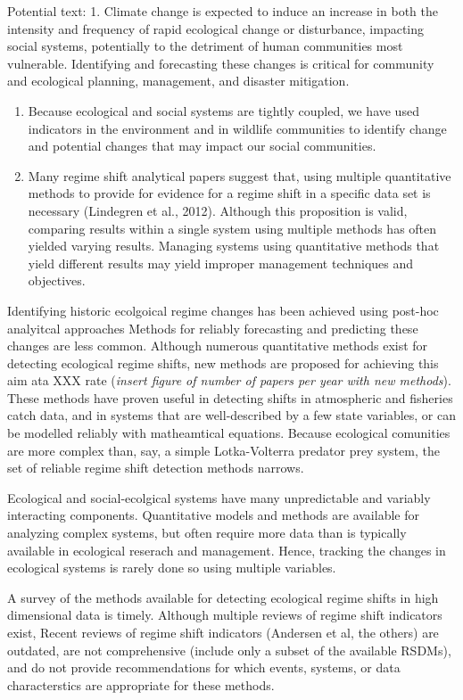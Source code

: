 \documentclass[12pt,twoside,openany]{reedthesis}
\begin{document}
Potential text: 1. Climate change is expected to induce an increase in
both the intensity and frequency of rapid ecological change or
disturbance, impacting social systems, potentially to the detriment of
human communities most vulnerable. Identifying and forecasting these
changes is critical for community and ecological planning, management,
and disaster mitigation.
\begin{enumerate}
\def\labelenumi{\arabic{enumi}.}
\item
  Because ecological and social systems are tightly coupled, we have
  used indicators in the environment and in wildlife communities to
  identify change and potential changes that may impact our social
  communities.
\item
  Many regime shift analytical papers suggest that, using multiple
  quantitative methods to provide for evidence for a regime shift in a
  specific data set is necessary (Lindegren et al., 2012). Although this
  proposition is valid, comparing results within a single system using
  multiple methods has often yielded varying results. Managing systems
  using quantitative methods that yield different results may yield
  improper management techniques and objectives.
\end{enumerate}
Identifying historic ecolgoical regime changes has been achieved using
post-hoc analyitcal approaches Methods for reliably forecasting and
predicting these changes are less common. Although numerous quantitative
methods exist for detecting ecological regime shifts, new methods are
proposed for achieving this aim ata XXX rate (\emph{insert figure of
number of papers per year with new methods}). These methods have proven
useful in detecting shifts in atmospheric and fisheries catch data, and
in systems that are well-described by a few state variables, or can be
modelled reliably with matheamtical equations. Because ecological
comunities are more complex than, say, a simple Lotka-Volterra predator
prey system, the set of reliable regime shift detection methods narrows.

Ecological and social-ecolgical systems have many unpredictable and
variably interacting components. Quantitative models and methods are
available for analyzing complex systems, but often require more data
than is typically available in ecological reserach and management.
Hence, tracking the changes in ecological systems is rarely done so
using multiple variables.

A survey of the methods available for detecting ecological regime shifts
in high dimensional data is timely. Although multiple reviews of regime
shift indicators exist, Recent reviews of regime shift indicators
(Andersen et al, the others) are outdated, are not comprehensive
(include only a subset of the available RSDMs), and do not provide
recommendations for which events, systems, or data characterstics are
appropriate for these methods.
\end{document}
